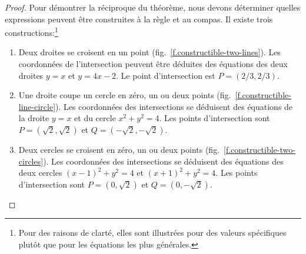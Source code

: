 \begin{proof}
\medskip

Pour démontrer la réciproque du théorème, nous devons déterminer quelles expressions peuvent être construites à la règle et au compas. Il existe trois constructions:\footnote{Pour des raisons de clarté, elles sont illustrées pour des valeurs spécifiques plutôt que pour les équations les plus générales.}

\begin{enumerate}
\item Deux droites se croisent en un point (fig.~\ref{f.constructible-two-lines}). Les coordonnées de l'intersection peuvent être déduites des équations des deux droites
$y=x$ et $y=4x-2$. Le point d'intersection est $P= (2/3, 2/3)$.

\item Une droite coupe un cercle en zéro, un ou deux points (fig.~\ref{f.constructible-line-circle}). Les coordonnées des intersections se déduisent des équations de la droite $y=x$ et du cercle $x^2+y^2=4$. Les points d'intersection sont
$P=(\sqrt{2}, \sqrt{2})$ et $Q=(-\sqrt{2}, -\sqrt{2})$.

\item Deux cercles se croisent en zéro, un ou deux points (fig.~\ref{f.constructible-two-circles}). Les coordonnées des intersections se déduisent des équations des deux cercles $(x-1)^2+y^2=4$ et $(x+1)^2+y^2=4$. Les points d'intersection sont $P=(0,\sqrt{2})$ et $Q=(0,-\sqrt{2})$.\qedhere
\end{enumerate}
\end{proof}

\vspace{0.4cm}

